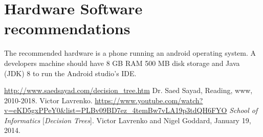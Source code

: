 \documentclass[a4paper]{article}
\begin{document}
\section{Hardware Software recommendations}
The recommended hardware is a phone running an android operating system. A developers machine should have 8 GB RAM 500 MB disk storage and Java (JDK) 8 to run the Android studio's IDE.
\newpage %
\begin{thebibliography}{9}
\url{http://www.saedsayad.com/decision_tree.htm}
Dr. Saed Sayad, Reading, www, 2010-2018.
Victor Lavrenko.
\url{https://www.youtube.com/watch?v=eKD5gxPPeY0&list=PLBv09BD7ez_4temBw7vLA19p3tdQH6FYO}
\textit{School of Informatics} 
[\textit{Decision Trees}]. 
Victor Lavrenko and Nigel Goddard, January 19, 2014.
\end{thebibliography}
\end{document}
